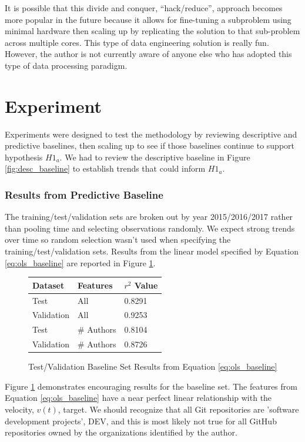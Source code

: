 \documentclass{article}
\begin{document}
It is possible that this divide and conquer, ``hack/reduce'', approach
becomes more popular in the future because it allows for fine-tuning a
subproblem using minimal hardware then scaling up by replicating the
solution to that sub-problem across multiple cores. This type of data
engineering solution is really fun. However, the author is not currently
aware of anyone else who has adopted this type of data processing paradigm.

\section{Experiment}

Experiments were designed to test the methodology by reviewing descriptive
and predictive baselines, then scaling up to see if those baselines continue
to support hypothesis $H1_a$. We had to review the descriptive baseline in
Figure \ref{fig:desc_baseline} to establish trends that could inform
$H1_a$. 

\subsubsection{Results from Predictive Baseline}

The training/test/validation sets are broken out by year 2015/2016/2017
rather than pooling time and selecting observations randomly. We expect
strong trends over time so random selection wasn't used when specifying the
training/test/validation sets. Results from the linear model specified
by Equation \ref{eq:ols_baseline} are reported in Figure
\ref{fig:ols_baseline}. 

\begin{figure}[h]
  \centering
  \begin{tabular}{ l|l|l }
    Dataset & Features & $r^2$ Value \\
    \hline
    Test       & All        & 0.8291 \\
    Validation & All        & 0.9253 \\
    Test       & \# Authors & 0.8104 \\
    Validation & \# Authors & 0.8726 \\
  \end{tabular}
  \caption{Test/Validation Baseline Set Results from Equation
    \ref{eq:ols_baseline}}
  \label{fig:ols_baseline}
\end{figure}

Figure \ref{fig:ols_baseline} demonstrates encouraging results for the
baseline set. The features from Equation \ref{eq:ols_baseline} have a
near perfect linear relationship with the velocity, $v(t)$, target. We should
recognize that all Git repositories are 'software development projects',
DEV, and this is most likely not true for all GitHub repositories owned
by the organizations identified by the author.
\end{document}
